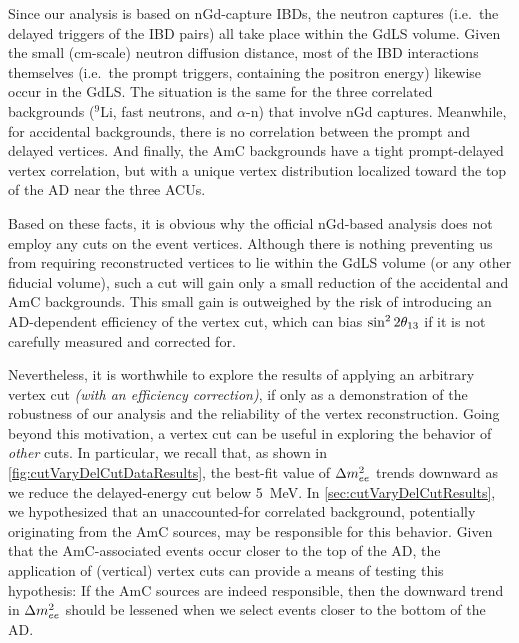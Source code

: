 \documentclass[../thesis.tex]{subfiles}
\begin{document}
\begin{comment}
  XXX Do our adjustments of background rates account for the fact that some backgrounds can occur in the GdLS+LS whereas others occur only in GdLS?

Accidentals -- Handled automatically, no adjustment, we're good
Li9, fast-n, alpha-n: Only in GdLS, ???
AmC: Both. R distribution unknown but probably ``lumpy''. Z probably like what we did.
\end{comment}

Since our analysis is based on nGd-capture IBDs, the neutron captures (i.e.\ the delayed triggers of the IBD pairs) all take place within the GdLS volume. Given the small (cm-scale) neutron diffusion distance, most of the IBD interactions themselves (i.e.\ the prompt triggers, containing the positron energy) likewise occur in the GdLS.
The situation is the same for the three correlated backgrounds ($^9$Li, fast neutrons, and $\alpha$-n) that involve nGd captures.
%
Meanwhile, for accidental backgrounds, there is no correlation between the prompt and delayed vertices.
And finally, the AmC backgrounds have a tight prompt-delayed vertex correlation, but with a unique vertex distribution localized toward the top of the AD near the three ACUs.

Based on these facts, it is obvious why the official nGd-based analysis does not employ any cuts on the event vertices. Although there is nothing preventing us from requiring reconstructed vertices to lie within the GdLS volume (or any other fiducial volume), such a cut will gain only a small reduction of the accidental and AmC backgrounds. This small gain is outweighed by the risk of introducing an AD-dependent efficiency of the vertex cut, which can bias $\sin^2 2\theta_{13}$ if it is not carefully measured and corrected for.

Nevertheless, it is worthwhile to explore the results of applying an arbitrary vertex cut \emph{(with an efficiency correction)}, if only as a demonstration of the robustness of our analysis and the reliability of the vertex reconstruction. Going beyond this motivation, a vertex cut can be useful in exploring the behavior of \emph{other} cuts. In particular, we recall that, as shown in \autoref{fig:cutVaryDelCutDataResults}, the best-fit value of $\Delta m^2_{ee}$ trends downward as we reduce the delayed-energy cut below 5~MeV. In \autoref{sec:cutVaryDelCutResults}, we hypothesized that an unaccounted-for correlated background, potentially originating from the AmC sources, may be responsible for this behavior. Given that the AmC-associated events occur closer to the top of the AD, the application of (vertical) vertex cuts can provide a means of testing this hypothesis: If the AmC sources are indeed responsible, then the downward trend in $\Delta m^2_{ee}$ should be lessened when we select events closer to the bottom of the AD\@.
\end{document}
